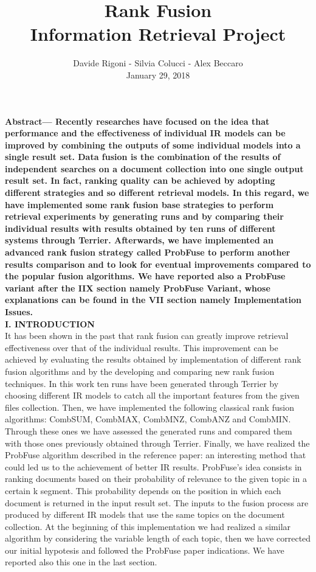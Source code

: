 \documentclass[12pt,journal]{IEEEtran}
\title{Rank Fusion \\ {\huge Information Retrieval Project}}
\author{Davide Rigoni - Silvia Colucci - Alex Beccaro \\ January 29, 2018}
\begin{document}
	\maketitle
	\textbf {Abstract— Recently researches have focused on the idea that performance and the effectiveness of individual IR models can be improved by combining the outputs of some individual models into a single result set. Data fusion is the combination of the results of independent searches on a document collection into one single output result set. In fact, ranking quality can be achieved by adopting different strategies and so different retrieval models.
In this regard, we have implemented some rank fusion base strategies to perform retrieval experiments by generating runs and by comparing their individual results with results obtained by ten runs of different systems through Terrier.
Afterwards, we have implemented an advanced rank fusion strategy called ProbFuse to perform another results comparison and to look for eventual improvements compared to the popular fusion algorithms. We have reported also a ProbFuse variant after the IIX section namely ProbFuse Variant, whose explanations can be found in the VII section namely Implementation Issues.} \\

\textbf{I. INTRODUCTION} \\
It has been shown in the past that rank fusion can greatly improve retrieval effectiveness over that of the individual results.
This improvement can be achieved by evaluating the results obtained by implementation of different rank fusion algorithms and by the developing and comparing new rank fusion techniques.
In this work ten runs have been generated through Terrier by choosing different IR models to catch all the important features from the given files collection. Then, we have implemented the following classical rank fusion algorithms: CombSUM, CombMAX, CombMNZ, CombANZ and CombMIN. Through these ones we have assessed the generated runs and compared them with those ones previously obtained through Terrier. 
Finally, we have realized the ProbFuse algorithm described in the reference paper: an interesting method that could led us to the achievement of better IR results.
ProbFuse’s idea consists in ranking documents based on their probability of relevance to the given topic in a certain k segment. This probability depends on the position in which each document is returned in the input result set. 
The inputs to the fusion process are produced by different IR models that use the same topics on the document collection. At the beginning of this implementation we had realized a similar algorithm by considering the variable length of each topic, then we have corrected our initial hypotesis and followed the ProbFuse paper indications. We have reported also this one in the last section.\\
\end{document}
